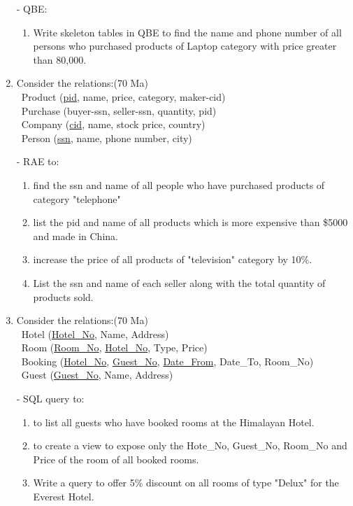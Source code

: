 \documentclass[12pt]{article}
\newcommand{\enter}{\\\textcolor{white}{1}}
\begin{document}
\begin{enumerate}
        - QBE:
        \begin{enumerate}[noitemsep, topsep = 0pt, label = \alph*.]
            \item Write skeleton tables in QBE to find the name and phone number of all persons who purchased products of Laptop category with price greater than 80,000.
        \end{enumerate}

    \item Consider the relations:\hfill(70 Ma)
        \enter Product (\underline{pid}, name, price, category, maker-cid)
        \enter Purchase (buyer-ssn, seller-ssn, quantity, pid)
        \enter Company (\underline{cid}, name, stock price, country)
        \enter Person (\underline{ssn}, name, phone number, city)

        - RAE to:
        \begin{enumerate}[noitemsep, topsep = 0pt, label = \alph*.]
            \item find the ssn and name of all people who have purchased products of category "telephone"
            \item list the pid and name of all products which is more expensive than \$5000 and made in China.
            \item increase the price of all products of "television" category by 10\%.
            \item List the ssn and name of each seller along with the total quantity of products sold.
        \end{enumerate}

    \item Consider the relations:\hfill(70 Ma)
        \enter Hotel (\underline{Hotel\_No}, Name, Address)
        \enter Room (\underline{Room\_No}, \underline{Hotel\_No}, Type, Price)
        \enter Booking (\underline{Hotel\_No}, \underline{Guest\_No}, \underline{Date\_From}, Date\_To, Room\_No)
        \enter Guest (\underline{Guest\_No}, Name, Address)

        - SQL query to:
        \begin{enumerate}[noitemsep, topsep = 0pt, label = \alph*.]
            \item to list all guests who have booked rooms at the Himalayan Hotel.
            \item to create a view to expose only the Hote\_No, Guest\_No, Room\_No and Price of the room of all booked rooms.
            \item Write a query to offer 5\% discount on all rooms of type "Delux" for the Everest Hotel.
        \end{enumerate}
        

\end{enumerate}
\end{document}
